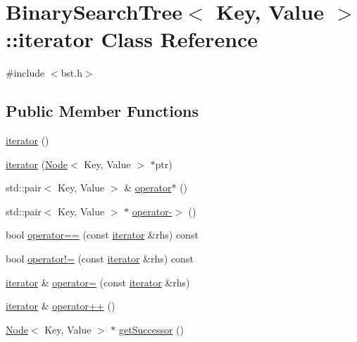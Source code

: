 \hypertarget{classBinarySearchTree_1_1iterator}{\section{Binary\-Search\-Tree$<$ Key, Value $>$\-:\-:iterator Class Reference}
\label{classBinarySearchTree_1_1iterator}
}


{\ttfamily \#include $<$bst.\-h$>$}

\subsection*{Public Member Functions}
\begin{DoxyCompactItemize}
\item 
\hyperlink{classBinarySearchTree_1_1iterator_aaf03ac21b275451f4d849688955d9fe8}{iterator} ()
\item 
\hyperlink{classBinarySearchTree_1_1iterator_ad2d047d6e1fda6f9e74a568fd0539d34}{iterator} (\hyperlink{classNode}{Node}$<$ Key, Value $>$ $\ast$ptr)
\item 
std\-::pair$<$ Key, Value $>$ \& \hyperlink{classBinarySearchTree_1_1iterator_ad327f8b97a8c9a2ad6ff67c012b11334}{operator$\ast$} ()
\item 
std\-::pair$<$ Key, Value $>$ $\ast$ \hyperlink{classBinarySearchTree_1_1iterator_a3e027f7cf4dd6f3955cdc10bf4cf21fd}{operator-\/$>$} ()
\item 
bool \hyperlink{classBinarySearchTree_1_1iterator_a71501a55f16e20da83f94fb322ebdba8}{operator==} (const \hyperlink{classBinarySearchTree_1_1iterator}{iterator} \&rhs) const 
\item 
bool \hyperlink{classBinarySearchTree_1_1iterator_a5f767164de9e1e7f7c4fd05c1b575e3d}{operator!=} (const \hyperlink{classBinarySearchTree_1_1iterator}{iterator} \&rhs) const 
\item 
\hyperlink{classBinarySearchTree_1_1iterator}{iterator} \& \hyperlink{classBinarySearchTree_1_1iterator_a02e4ae80899345cca597757cf41a803d}{operator=} (const \hyperlink{classBinarySearchTree_1_1iterator}{iterator} \&rhs)
\item 
\hyperlink{classBinarySearchTree_1_1iterator}{iterator} \& \hyperlink{classBinarySearchTree_1_1iterator_a9ed876ed9daa9319fa7260453c522d9c}{operator++} ()
\item 
\hyperlink{classNode}{Node}$<$ Key, Value $>$ $\ast$ \hyperlink{classBinarySearchTree_1_1iterator_addfcfe8fbc7bdaf74f694c6bb7dd2243}{get\-Successor} ()
\end{DoxyCompactItemize}
